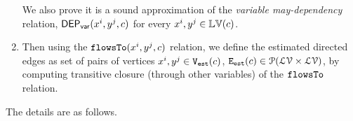 \begin{enumerate}
 We also prove it is a sound approximation 
 of the \emph{variable may-dependency} relation, $\mathsf{DEP_{var}}(x^i, y^j, c)$ for every $x^i, y^j \in \mathbb{LV}(c)$.
\item 
Then 
using the $\mathtt{flowsTo}(x^i, y^j, c)$ relation, we define the estimated directed edges
as set of pairs of vertices $x^i, y^j\in \mathtt{{V_{est}}}(c)$,
$\mathtt{{E_{est}}}(c) \in \mathcal{P}( \mathcal{LV} \times \mathcal{LV})$, by computing
transitive closure (through other variables) of the 
 $\mathtt{flowsTo}$ relation.
\end{enumerate} 
The details are as follows.
%
